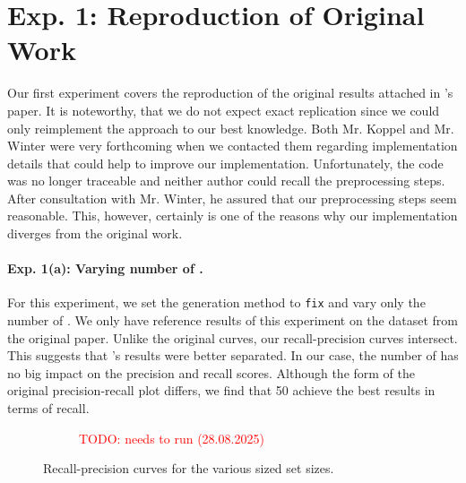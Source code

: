 
\section{Exp. 1: Reproduction of Original Work}

Our first experiment covers the reproduction of the original results attached in \citet{koppel_determining_2014}'s paper.
It is noteworthy, that we do not expect exact replication since we could only reimplement the approach to our best knowledge.
Both Mr. Koppel and Mr. Winter were very forthcoming when we contacted them regarding implementation details that could help to improve our implementation.
Unfortunately, the code was no longer traceable and neither author could recall the preprocessing steps.
After consultation with Mr. Winter, he assured that our preprocessing steps seem reasonable.
This, however, certainly is one of the reasons why our implementation diverges from the original work.

\paragraph{Exp. 1(a): Varying number of \imps{}.}

For this experiment, we set the \imp{} generation method to \texttt{fix} and vary only the number of \imps{}.
We only have reference results of this experiment on the \dataBlog{} dataset from the original paper.
Unlike the original curves, our \impAppr{} recall-precision curves intersect.
This suggests that \citet{koppel_determining_2014}'s results were better separated.
In our case, the number of \imps{} has no big impact on the precision and recall scores.
Although the form of the original precision-recall plot differs, we find that 50 \imps{} achieve the best results in terms of recall.

\begin{figure}[htbp]
  \centering
  \begin{subfigure}[b]{0.48\textwidth}
    \centering
    
    \caption{\dataBlog{} \textcolor{red}{TODO: needs to run (28.08.2025)}}
    \label{fig:blog_dif_n}
  \end{subfigure}
  \hfill
  \begin{subfigure}[b]{0.48\textwidth}
    \centering
    
    \caption{\dataStudent{}}
    \label{fig:student_essays_dif_n}
  \end{subfigure}
  \caption{Recall-precision curves for the various sized \imp{} set sizes.}
  \label{fig:repr_diff_n_imps_fixed}
\end{figure}


